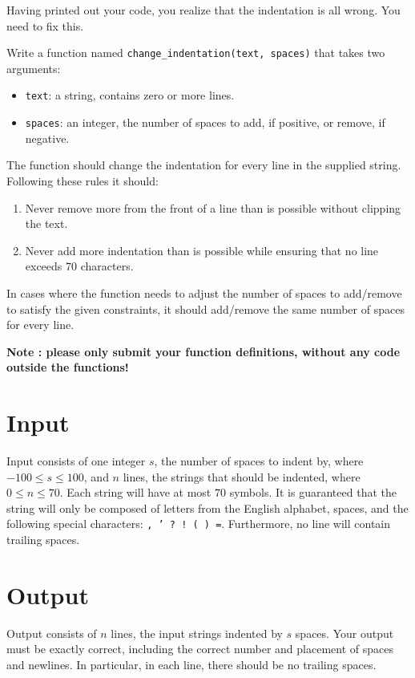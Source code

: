 
Having printed out your code, you realize that the indentation is all wrong. You need to fix this.

Write a function named \texttt{change\_indentation(text, spaces)} that takes two arguments:
\begin{itemize}
    \item \texttt{text}: a string, contains zero or more lines.
    \item \texttt{spaces}: an integer, the number of spaces to add, if positive, or remove, if negative.
\end{itemize}

The function should change the indentation for every line in the supplied string.
Following these rules it should:
\begin{enumerate}
    \item Never remove more from the front of a line than is possible without clipping the text.
    \item Never add more indentation than is possible while ensuring that no line exceeds 70 characters.
\end{enumerate}

In cases where the function needs to adjust the number of spaces
to add/remove to satisfy the given constraints,
it should add/remove the same number of spaces for every line.

\textbf{Note : please only submit your function definitions, without any code outside the functions!}


\section*{Input}
Input consists of one integer $s$, the number of spaces to indent by, where $-100 \leq s \leq 100$,
and $n$ lines, the strings that should be indented, where $0 \leq n \leq 70$.
Each string will have at most $70$ symbols.
It is guaranteed that the string will only be composed of letters from the English alphabet, spaces, and the following special characters: \texttt{, ' ? ! ( ) =}.
Furthermore, no line will contain trailing spaces.

\section*{Output}
Output consists of $n$ lines, the input strings indented by $s$ spaces.
Your output must be exactly correct, including the correct number and placement of spaces and newlines.
In particular, in each line, there should be no trailing spaces.

